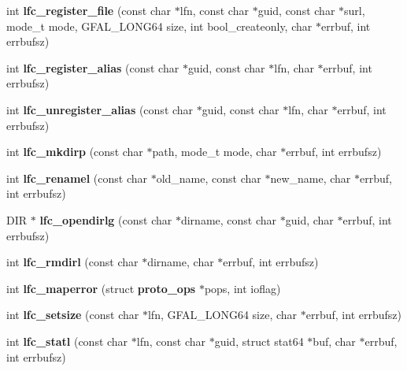 \begin{DoxyCompactItemize}
\item 
int {\bfseries lfc\_\-register\_\-file} (const char $\ast$lfn, const char $\ast$guid, const char $\ast$surl, mode\_\-t mode, GFAL\_\-LONG64 size, int bool\_\-createonly, char $\ast$errbuf, int errbufsz)\label{group__lfc__low__group_gae374ef020eaa20cc4d3887f419988bb5}

\item 
int {\bfseries lfc\_\-register\_\-alias} (const char $\ast$guid, const char $\ast$lfn, char $\ast$errbuf, int errbufsz)\label{group__lfc__low__group_gaf5d9e431cef64218ec4a9d7ea4c83e5d}

\item 
int {\bfseries lfc\_\-unregister\_\-alias} (const char $\ast$guid, const char $\ast$lfn, char $\ast$errbuf, int errbufsz)\label{group__lfc__low__group_ga5cda1bf078a1ff38e4a5634be681c070}

\item 
int {\bfseries lfc\_\-mkdirp} (const char $\ast$path, mode\_\-t mode, char $\ast$errbuf, int errbufsz)\label{group__lfc__low__group_ga3e91ea3be60dd14651eb02bc74939982}

\item 
int {\bfseries lfc\_\-renamel} (const char $\ast$old\_\-name, const char $\ast$new\_\-name, char $\ast$errbuf, int errbufsz)\label{group__lfc__low__group_ga0c0701cf0e966f698270061818b1dd35}

\item 
DIR $\ast$ {\bfseries lfc\_\-opendirlg} (const char $\ast$dirname, const char $\ast$guid, char $\ast$errbuf, int errbufsz)\label{group__lfc__low__group_gad08c307ed11bd3ec055de4b678387d8f}

\item 
int {\bfseries lfc\_\-rmdirl} (const char $\ast$dirname, char $\ast$errbuf, int errbufsz)\label{group__lfc__low__group_ga466ec4eaa033e1837ddbc528d27f4fdb}

\item 
int {\bfseries lfc\_\-maperror} (struct {\bf proto\_\-ops} $\ast$pops, int ioflag)\label{group__lfc__low__group_ga6656c5c83f930300965dc7431284f34c}

\item 
int {\bfseries lfc\_\-setsize} (const char $\ast$lfn, GFAL\_\-LONG64 size, char $\ast$errbuf, int errbufsz)\label{group__lfc__low__group_ga6b922ee5e927824e365719936480ddf5}

\item 
int {\bfseries lfc\_\-statl} (const char $\ast$lfn, const char $\ast$guid, struct stat64 $\ast$buf, char $\ast$errbuf, int errbufsz)\label{group__lfc__low__group_ga94c524f433cfca09de6209dd053aa82b}


\end{DoxyCompactItemize}
